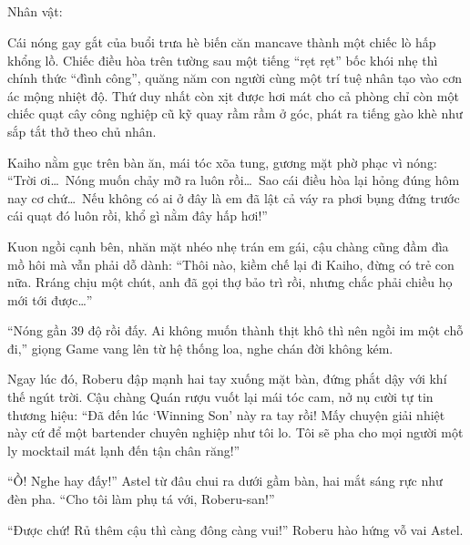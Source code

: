 \documentclass[../main.tex]{subfiles}
\begin{document}
\subsection*{\label{ep-SM1.IV}}
\vspace{-4pt}
\begin{center}
  {\caviar\fontsize{12pt}{12pt}\selectfont Nhân vật:      }
\end{center}

Cái nóng gay gắt của buổi trưa hè biến căn mancave thành một chiếc lò hấp khổng lồ. Chiếc điều hòa trên tường sau một tiếng ``rẹt rẹt'' bốc khói nhẹ thì chính thức ``đình công'', quăng năm con người cùng một trí tuệ nhân tạo vào cơn ác mộng nhiệt độ. Thứ duy nhất còn xịt được hơi mát cho cả phòng chỉ còn một chiếc quạt cây công nghiệp cũ kỹ quay rầm rầm ở góc, phát ra tiếng gào khè như sắp tắt thở theo chủ nhân.

Kaiho nằm gục trên bàn ăn, mái tóc xõa tung, gương mặt phờ phạc vì nóng: ``Trời ơi\dots\ Nóng muốn chảy mỡ ra luôn rồi\dots\ Sao cái điều hòa lại hỏng đúng hôm nay cơ chứ\dots\ Nếu không có ai ở đây là em đã lật cả váy ra phơi bụng đứng trước cái quạt đó luôn rồi, khổ gì nằm đây hấp hơi!''

Kuon ngồi cạnh bên, nhăn mặt nhéo nhẹ trán em gái, cậu chàng cũng đầm đìa mồ hôi mà vẫn phải dỗ dành: ``Thôi nào, kiềm chế lại đi Kaiho, đừng có trẻ con nữa. Rráng chịu một chút, anh đã gọi thợ bảo trì rồi, nhưng chắc phải chiều họ mới tới được\dots''

``Nóng gần 39 độ rồi đấy. Ai không muốn thành thịt khô thì nên ngồi im một chỗ đi,'' giọng Game vang lên từ hệ thống loa, nghe chán đời không kém.

Ngay lúc đó, Roberu đập mạnh hai tay xuống mặt bàn, đứng phắt dậy với khí thế ngút trời. Cậu chàng Quán rượu vuốt lại mái tóc cam, nở nụ cười tự tin thương hiệu: ``Đã đến lúc `Winning Son' này ra tay rồi! Mấy chuyện giải nhiệt này cứ để một bartender chuyên nghiệp như tôi lo. Tôi sẽ pha cho mọi người một ly mocktail mát lạnh đến tận chân răng!''

``Ồ! Nghe hay đấy!'' Astel từ đâu chui ra dưới gầm bàn, hai mắt sáng rực như đèn pha. ``Cho tôi làm phụ tá với, Roberu-san!''

``Được chứ! Rủ thêm cậu thì càng đông càng vui!'' Roberu hào hứng vỗ vai Astel.
\end{document}
